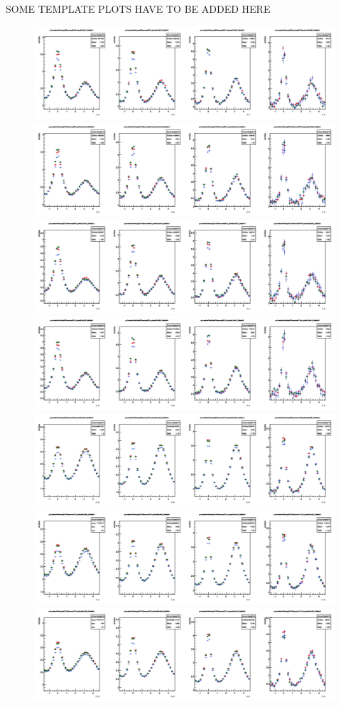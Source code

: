 SOME TEMPLATE PLOTS HAVE TO BE ADDED HERE


\begin{figure}
\centering
\includegraphics[width=.49\linewidth]{figures/Template/1DCompare_allDpTfromB_AssoPt_0.3to99.0GeVc_Perugia0.png}
\includegraphics[width=.49\linewidth]{figures/Template/1DCompare_allDpTfromB_AssoPt_0.3to99.0GeVc_Perugia2010.png}
\includegraphics[width=.49\linewidth]{figures/Template/1DCompare_allDpTfromB_AssoPt_0.3to99.0GeVc_Perugia2011.png}
\includegraphics[width=.49\linewidth]{figures/Template/1DCompare_allDpTfromB_AssoPt_0.3to99.0GeVc_Pythia8.png}
\includegraphics[width=.49\linewidth]{figures/Template/1DCompare_allDpTfromC_AssoPt_0.3to99.0GeVc_Perugia0.png}
\includegraphics[width=.49\linewidth]{figures/Template/1DCompare_allDpTfromC_AssoPt_0.3to99.0GeVc_Perugia2010.png}
\includegraphics[width=.49\linewidth]{figures/Template/1DCompare_allDpTfromC_AssoPt_0.3to99.0GeVc_Perugia2011.png}

\end{figure}

